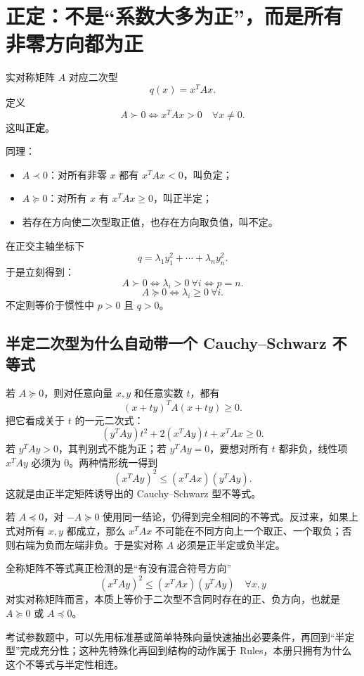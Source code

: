 \documentclass[11pt,a4paper]{ctexart}
\newcommand{\kw}[1]{\textbf{\color{deep}#1}}
\begin{document}
\section{正定：不是“系数大多为正”，而是所有非零方向都为正}

实对称矩阵 $A$ 对应二次型
\[
q(x)=x^TAx.
\]
定义
\[
\boxed{A\succ0
\iff x^TAx>0\quad\forall x\neq0.}
\]
这叫\kw{正定}。

同理：
\begin{itemize}
  \item $A\prec0$：对所有非零 $x$ 都有 $x^TAx<0$，叫负定；
  \item $A\succeq0$：对所有 $x$ 有 $x^TAx\ge0$，叫正半定；
  \item 若存在方向使二次型取正值，也存在方向取负值，叫不定。
\end{itemize}

在正交主轴坐标下
\[
q=\lambda_1y_1^2+\cdots+\lambda_ny_n^2.
\]
于是立刻得到：
\[
\boxed{A\succ0\iff \lambda_i>0\ \forall i\iff p=n.}
\]
\[
\boxed{A\succeq0\iff \lambda_i\ge0\ \forall i.}
\]
不定则等价于惯性中 $p>0$ 且 $q>0$。

\subsection{半定二次型为什么自动带一个 Cauchy--Schwarz 不等式}

若 $A\succeq0$，则对任意向量 $x,y$ 和任意实数 $t$，都有
\[
(x+ty)^TA(x+ty)\ge0.
\]
把它看成关于 $t$ 的一元二次式：
\[
(y^TAy)t^2+2(x^TAy)t+x^TAx\ge0.
\]
若 $y^TAy>0$，其判别式不能为正；若 $y^TAy=0$，要想对所有 $t$ 都非负，线性项 $x^TAy$ 必须为 $0$。两种情形统一得到
\[
\boxed{
(x^TAy)^2\le (x^TAx)(y^TAy).
}
\]
这就是由正半定矩阵诱导出的 Cauchy--Schwarz 型不等式。

若 $A\preceq0$，对 $-A\succeq0$ 使用同一结论，仍得到完全相同的不等式。反过来，如果上式对所有 $x,y$ 都成立，那么 $x^TAx$ 不可能在不同方向上一个取正、一个取负；否则右端为负而左端非负。于是实对称 $A$ 必须是正半定或负半定。

\begin{corebox}{全称矩阵不等式真正检测的是“有没有混合符号方向”}
\[
\boxed{
(x^TAy)^2\le (x^TAx)(y^TAy)\quad\forall x,y
}
\]
对实对称矩阵而言，本质上等价于二次型不含同时存在的正、负方向，也就是 $A\succeq0$ 或 $A\preceq0$。

考试参数题中，可以先用标准基或简单特殊向量快速抽出必要条件，再回到“半定型”完成充分性；这种先特殊化再回到结构的动作属于 Rules，本册只拥有为什么这个不等式与半定性相连。
\end{corebox}
\end{document}
